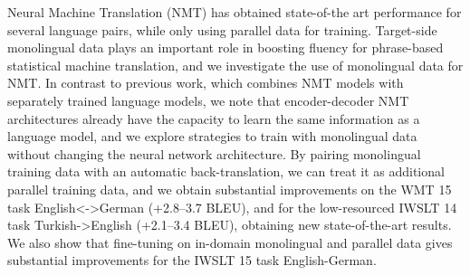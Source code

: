 Neural Machine Translation (NMT) has obtained state-of-the art performance for several language pairs, while only using parallel data for training. Target-side monolingual data plays an important role in boosting fluency for phrase-based statistical machine translation, and we investigate the use of monolingual data for NMT. In contrast to previous work, which combines NMT models with separately trained language models, we note that encoder-decoder NMT architectures already have the capacity to learn the same information as a language model, and we explore strategies to train with monolingual data without changing the neural network architecture. By pairing monolingual training data with an automatic back-translation, we can treat it as additional parallel training data, and we obtain substantial improvements on the WMT 15 task English<->German (+2.8--3.7 BLEU), and for the low-resourced IWSLT 14 task Turkish->English (+2.1--3.4 BLEU), obtaining new state-of-the-art results. We also show that fine-tuning on in-domain monolingual and parallel data gives substantial improvements for the IWSLT 15 task English-German.
